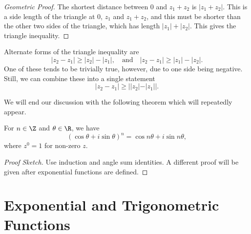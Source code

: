 \documentclass[a4paper]{scrreprt}
\begin{document}
\begin{center}
  \end{center}

\begin{proof}[Geometric Proof]
	The shortest distance between $0$ and $z_1 + z_2$ is $|z_1 + z_2|$. This is a side length of the triangle at $0$, $z_1$ and $z_1 + z_2$, and this must be shorter than the other two sides of the triangle, which has length $|z_1| + |z_2|$. This gives the triangle inequality. 
\end{proof}

Alternate forms of the triangle inequality are
$$
|z_2 - z_1| \geq |z_2| - |z_1|, \quad \text{and} \quad |z_2  - z_1| \geq |z_1| - |z_2|.
$$
One of these tends to be trivially true, however, due to one side being negative. Still, we can combine these into a single statement
$$
|z_2 - z_1| \geq ||z_2| - |z_1||.
$$

We will end our discussion with the following theorem which will repeatedly appear.

\begin{theorem}
	For $n \in \Z$ and $\theta \in \R$, we have
	$$
	(\cos \theta + i \sin \theta)^n = \cos n \theta + i \sin n \theta,
	$$
	where $z^0 = 1$ for non-zero $z$.
\end{theorem}
\begin{proof}[Proof Sketch]
	Use induction and angle sum identities. A different proof will be given after exponential functions are defined.
\end{proof}

\section{Exponential and Trigonometric Functions}
\end{document}
